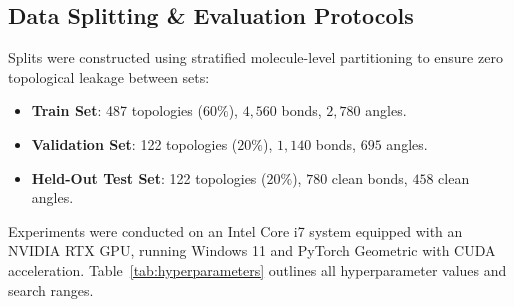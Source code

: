 \documentclass[11pt,a4paper]{article}
\begin{document}
\subsection{Data Splitting \& Evaluation Protocols}
Splits were constructed using stratified molecule-level partitioning to ensure zero topological leakage between sets:
\begin{itemize}
    \item \textbf{Train Set}: 487 topologies ($60\%$), $4{,}560$ bonds, $2{,}780$ angles.
    \item \textbf{Validation Set}: 122 topologies ($20\%$), $1{,}140$ bonds, $695$ angles.
    \item \textbf{Held-Out Test Set}: 122 topologies ($20\%$), $780$ clean bonds, $458$ clean angles.
\end{itemize}

Experiments were conducted on an Intel Core i7 system equipped with an NVIDIA RTX GPU, running Windows 11 and PyTorch Geometric with CUDA acceleration. Table~\ref{tab:hyperparameters} outlines all hyperparameter values and search ranges.
\end{document}
